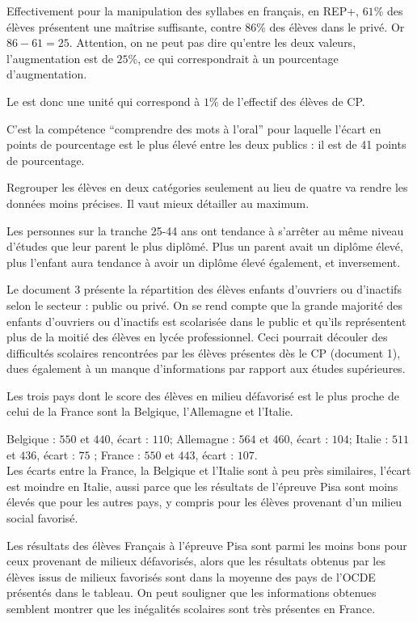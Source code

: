 \documentclass[12pt,a4paper]{book}
\begin{document}
\begin{enumMet}
	\item Effectivement pour la manipulation des syllabes en français, en REP+, $61$\% des élèves présentent une maîtrise suffisante, contre $86$\% des élèves dans le privé. Or $86 - 61 = 25$. Attention, on ne peut pas dire qu'entre les deux valeurs, l'augmentation est de $25$\%, ce qui correspondrait à un pourcentage d'augmentation.
	
	Le  est donc une unité qui correspond à $1\%$ de l'effectif des élèves de CP.
	\item C'est la compétence “comprendre des mots à l'oral” pour laquelle l'écart en points de pourcentage est le plus élevé entre les deux publics : il est de 41 points de pourcentage.
	\item Regrouper les élèves en deux catégories seulement au lieu de quatre va rendre les données moins précises. Il vaut mieux détailler au maximum.
	\item Les personnes sur la tranche 25-44 ans ont tendance à s'arrêter au même niveau d'études que leur parent le plus diplômé. Plus un parent avait un diplôme élevé, plus l'enfant aura tendance à avoir un diplôme élevé également, et inversement.
	\item Le document 3 présente la répartition des élèves enfants d'ouvriers ou d'inactifs selon le secteur : public ou privé. On se rend compte que la grande majorité des enfants d'ouvriers ou d'inactifs est scolarisée dans le public et qu'ils représentent plus de la moitié des élèves en lycée professionnel. Ceci pourrait découler des difficultés scolaires rencontrées par les élèves présentes dès le CP (document 1), dues également à un manque d'informations par rapport aux études supérieures. 
	\item 
	\begin{enumMet}
		\item Les trois pays dont le score des élèves en milieu défavorisé est le plus proche de celui de la France sont la Belgique, l'Allemagne et l'Italie.
		\item Belgique : $550$ et $440$, écart : $110$; Allemagne : $564$ et $460$, écart : $104$; Italie : $511$ et $436$, écart : $75$ ; France : $550$ et $443$, écart : $107$.\\
		Les écarts entre la France, la Belgique et l'Italie sont à peu près similaires, l'écart est moindre en Italie, aussi parce que les résultats de l'épreuve Pisa sont moins élevés que pour les autres pays, y compris pour les élèves provenant d'un milieu social favorisé.
		\item Les résultats des élèves Français à l'épreuve Pisa sont parmi les moins bons pour ceux provenant de milieux défavorisés, alors que les résultats obtenus par les élèves issus de milieux favorisés sont dans la moyenne des pays de l'OCDE présentés dans le tableau. On peut souligner que les informations obtenues semblent montrer que les inégalités scolaires sont très présentes en France. 
	\end{enumMet}
\end{enumMet}
\end{document}
